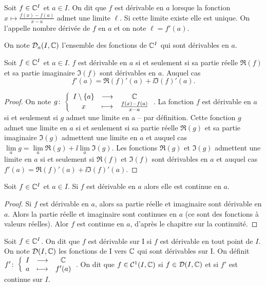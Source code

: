 \begin{defdef}
  Soit $f \in \mathbb{C}^I$ et $a \in I$. On dit que $f$ est dérivable en $a$ lorsque la fonction $x \longmapsto \frac{f(x)-f(a)}{x-a}$ admet une limite $\ell$. Si cette limite existe elle est unique. On l'appelle nombre dérivée de $f$ en $a$ et on note $\ell=f'(a)$.

On note $\mathcal{D}_{a}(I,\mathbb{C})$ l'ensemble des fonctions de $\mathbb{C}^I$ qui sont dérivables en $a$.
\end{defdef}
\begin{theo}
  Soit $f \in \mathbb{C}^I$ et $a \in I$. $f$ est dérivable en $a$ si et seulement si sa partie réelle $\Re(f)$ et sa partie imaginaire $\Im(f)$ sont dérivables en $a$. Auquel cas
  \begin{equation}
    f'(a) = \Re(f)'(a) + \ii \Im(f)'(a).
  \end{equation}
\end{theo}
\begin{proof}
 On note $g\colon \left\{\begin{array}{ccc} I\setminus\{a\} & \longrightarrow &\mathbb{C}\\ x & \longmapsto & \frac{f(x)-f(a)}{x-a} \end{array} \right.$. La fonction $f$ est dérivable en $a$ si et seulement si $g$ admet une limite en a -- par définition. Cette fonction $g$ admet une limite en $a$ si et seulement si sa partie réelle $\Re(g)$ et sa partie imaginaire $\Im(g)$ admettent une limite en $a$ et auquel cas $\lim\limits_{a}g =  \lim\limits_{a} \Re(g) + \ii \lim\limits_{a} \Im(g)$. Les fonctions $\Re(g)$ et $\Im(g)$ admettent une limite en $a$ si et seulement si  $\Re(f)$ et $\Im(f)$ sont dérivables en $a$ et auquel cas $f'(a) = \Re(f)'(a) + \ii \Im(f)'(a)$.
\end{proof}
\begin{prop}
  Soit $f \in \mathbb{C}^I$ et $a \in I$. Si $f$ est dérivable en $a$ alors elle est continue en $a$.
\end{prop}
\begin{proof}
  Si $f$ est dérivable en $a$, alors sa partie réelle et imaginaire sont dérivable en $a$. Alors la partie réelle et imaginaire sont continues en $a$ (ce sont des fonctions à valeurs réelles). Alor $f$ est continue en $a$, d'après le chapitre sur la continuité.
\end{proof}
\begin{defdef}
  Soit $f \in \mathbb{C}^I$. On dit que $f$ est dérivable sur I si $f$ est dérivable en tout point de $I$. On note $\mathcal{D}(I,\mathbb{C})$ les fonctions de I vers $\mathbb{C}$ qui sont dérivables sur I. On définit $f'\colon \left\{\begin{array}{ccc} I & \longrightarrow &\mathbb{C}\\ a & \longmapsto & f'(a) \end{array} \right.$. On dit que $f \in \mathcal{C}^{1}(I,\mathbb{C})$ si $f \in \mathcal{D}(I,\mathbb{C})$ et si $f'$ est continue sur $I$.
\end{defdef}

